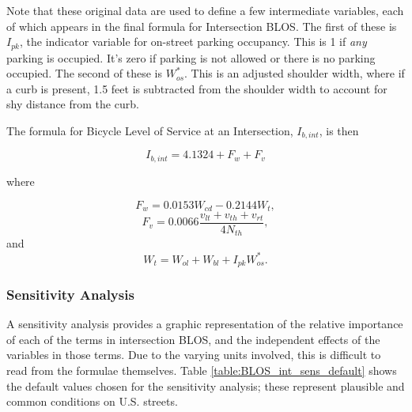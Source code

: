 \documentclass[11pt]{article} %
\begin{document}
\begin{landscape}
\restoregeometry
\end{landscape}


Note that these original data are used to define a few intermediate variables, each of which appears in the final formula for Intersection BLOS. The first of these is $I_{pk}$, the indicator variable for on-street parking occupancy. This is 1 if \emph{any} parking is occupied. It's zero if parking is not allowed or there is no parking occupied. The second of these is $W_{os}^*$. This is an adjusted shoulder width, where if a curb is present, 1.5 feet is subtracted from the shoulder width to account for shy distance from the curb.

The formula for Bicycle Level of Service at an Intersection, $I_{b,int}$, is then

$$I_{b,int} = 4.1324 + F_w + F_v$$

where

$$ F_w = 0.0153W_{cd}-0.2144W_t ,$$
$$ F_v = 0.0066\frac{v_{lt}+v_{th}+v_{rt}}{4N_{th}},$$
and
$$ W_t = W_{ol}+W_{bl}+I_{pk}W_{os}^* .$$



\subsubsection{Sensitivity Analysis}

A sensitivity analysis provides a graphic representation of the relative importance of each of the terms in intersection BLOS, and the independent effects of the variables in those terms. Due to the varying units involved, this is difficult to read from the formulae themselves. Table \ref{table:BLOS_int_sens_default} shows the default values chosen for the sensitivity analysis; these represent plausible and common conditions on U.S. streets.
\end{document}
